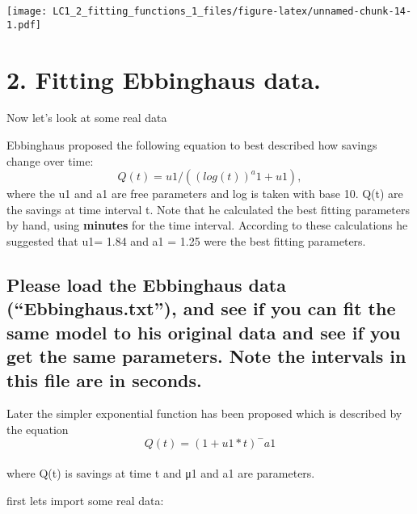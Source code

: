\documentclass[]{article}
\newenvironment{Shaded}{\begin{snugshade}}{\end{snugshade}}
\newcommand{\KeywordTok}[1]{\textcolor[rgb]{0.13,0.29,0.53}{\textbf{#1}}}
\newcommand{\DataTypeTok}[1]{\textcolor[rgb]{0.13,0.29,0.53}{#1}}
\newcommand{\CharTok}[1]{\textcolor[rgb]{0.31,0.60,0.02}{#1}}
\newcommand{\StringTok}[1]{\textcolor[rgb]{0.31,0.60,0.02}{#1}}
\newcommand{\CommentTok}[1]{\textcolor[rgb]{0.56,0.35,0.01}{\textit{#1}}}
\newcommand{\OtherTok}[1]{\textcolor[rgb]{0.56,0.35,0.01}{#1}}
\newcommand{\NormalTok}[1]{#1}
\begin{document}
\texttt{[image: LC1\_2\_fitting\_functions\_1\_files/figure-latex/unnamed-chunk-14-1.pdf]}

\section{2. Fitting Ebbinghaus data.}\label{fitting-ebbinghaus-data.}

Now let's look at some real data

Ebbinghaus proposed the following equation to best described how savings
change over time:\\
\[  Q(t) = u1 / ((log(t))^a1 + u1), \] where the u1 and a1 are free
parameters and log is taken with base 10. Q(t) are the savings at time
interval t. Note that he calculated the best fitting parameters by hand,
using \textbf{minutes} for the time interval. According to these
calculations he suggested that u1= 1.84 and a1 = 1.25 were the best
fitting parameters.

\subsection{\texorpdfstring{Please load the Ebbinghaus data
(``Ebbinghaus.txt''), and see if you can fit the same model to his
original data and see if you get the same parameters. Note the intervals
in this file are in
\textbf{seconds}.}{Please load the Ebbinghaus data (Ebbinghaus.txt), and see if you can fit the same model to his original data and see if you get the same parameters. Note the intervals in this file are in seconds.}}\label{please-load-the-ebbinghaus-data-ebbinghaus.txt-and-see-if-you-can-fit-the-same-model-to-his-original-data-and-see-if-you-get-the-same-parameters.-note-the-intervals-in-this-file-are-in-seconds.}

Later the simpler exponential function has been proposed which is
described by the equation\\
\[  Q(t)=(1+u1*t)^-a1 \]\\
where Q(t) is savings at time t and μ1 and a1 are parameters.

first lets import some real data:

\begin{Shaded}
\end{Shaded}
\end{document}
